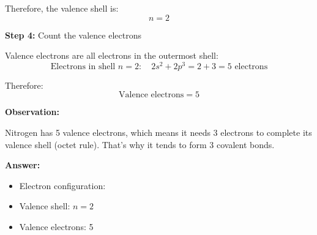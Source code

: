 \begin{exercise}
\begin{solu}
        Therefore, the valence shell is:
        \[
            \boxed{n = 2}
        \]

        \textbf{Step 4:} Count the valence electrons

        Valence electrons are all electrons in the outermost shell:
        \[
            \text{Electrons in shell } n = 2: \quad 2s^2 + 2p^3 = 2 + 3 = 5 \text{ electrons}
        \]

        Therefore:
        \[
            \boxed{\text{Valence electrons} = 5}
        \]

        \textbf{Observation:}

        Nitrogen has 5 valence electrons, which means it needs 3 electrons to complete its valence shell (octet rule). That's why it tends to form 3 covalent bonds.

        \textbf{Answer:}
        \begin{itemize}
            \item Electron configuration: 
            \item Valence shell: \(n = 2\)
            \item Valence electrons: 5
        \end{itemize}
    \end{solu}
\end{exercise}
